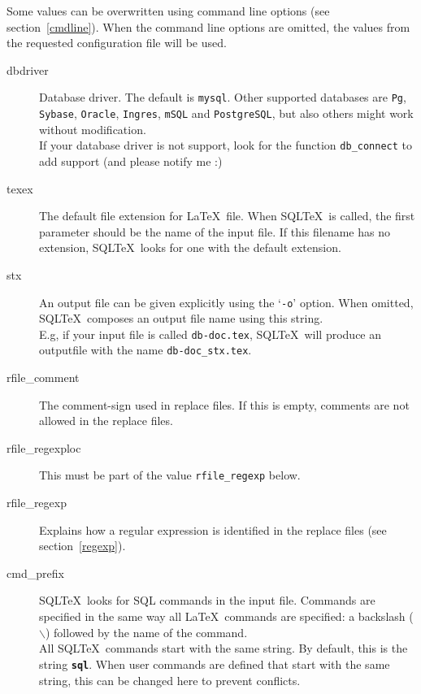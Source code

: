 \documentclass{article}
\newcommand{\bs}{\ensuremath{\backslash}}
\newcommand{\vs}{\vspace{3mm}}
\begin{document}
\vs

Some values can be overwritten using command line options (see section~\ref{cmdline}). When the command line options are omitted, the values from the requested configuration file will be used.

\begin{description}

\item[dbdriver] Database driver. The default is \texttt{mysql}.
Other supported databases are \texttt{Pg}, \texttt{Sybase}, \texttt{Oracle},
\texttt{Ingres}, \texttt{mSQL} and \texttt{PostgreSQL}, but also others might
work without modification. \\
If your database driver is not support, look for the function
\texttt{db\_connect} to add support (and please notify me :) 

\item[texex] The default file extension for \LaTeX\ file. When SQL\TeX\ is called, the first
parameter should be the name of the input file. If this filename has no extension,
SQL\TeX\ looks for one with the default extension.

\item[stx] An output file can be given explicitly using the `\texttt{-o}' option. When omitted,
SQL\TeX\ composes an output file name using this string.\\
E.g, if your input file is called \texttt{db-doc.tex}, SQL\TeX\ will produce an
outputfile with the name \texttt{db-doc\_stx.tex}.

\item[rfile\_comment] The comment-sign used in replace files. If this is empty, comments are not allowed in
the replace files.

\item[rfile\_regexploc] This must be part of the value \texttt{rfile\_regexp} below. 

\item[rfile\_regexp] Explains how a regular expression is identified in the replace files (see section~\ref{regexp}). 

\item[cmd\_prefix]\label{prefix} SQL\TeX\ looks for SQL commands in the input file. Commands are specified in the
same way all \LaTeX\ commands are specified: a backslash (\bs) followed by the
name of the command.\\
All SQL\TeX\ commands start with the same string. By default, this is the string
\texttt{\textbf{sql}}. When user commands are defined that start with the same
string, this can be changed here to prevent conflicts.


\end{description}
\end{document}
